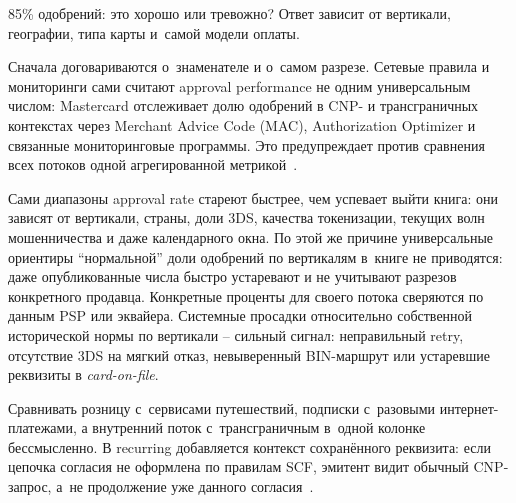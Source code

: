 85\% одобрений: это хорошо или тревожно? Ответ зависит от
вертикали, географии, типа карты и~самой модели оплаты.

Сначала договариваются о~знаменателе и о~самом разрезе. Сетевые
правила и мониторинги сами считают approval performance не одним
универсальным числом: Mastercard отслеживает долю одобрений
в CNP- и трансграничных контекстах через Merchant Advice
Code (MAC), Authorization Optimizer и связанные
мониторинговые программы. Это предупреждает против сравнения
всех потоков одной агрегированной метрикой~\cite{mc-tpr}.

Сами диапазоны approval rate стареют быстрее, чем успевает
выйти книга: они зависят от вертикали, страны, доли 3DS,
качества токенизации, текущих волн мошенничества и даже
календарного окна. По этой же причине универсальные ориентиры
\enquote{нормальной} доли одобрений по вертикалям в~книге
не приводятся: даже опубликованные числа быстро устаревают
и не учитывают разрезов конкретного продавца. Конкретные
проценты для своего потока сверяются по данным PSP или
эквайера. Системные просадки относительно собственной
исторической нормы по вертикали -- сильный сигнал: неправильный
retry, отсутствие 3DS на мягкий отказ, невыверенный BIN-маршрут
или устаревшие реквизиты в \textit{card-on-file}.

Сравнивать розницу с~сервисами путешествий, подписки с~разовыми
интернет-платежами, а внутренний поток с~трансграничным в~одной колонке
бессмысленно. В recurring добавляется контекст
сохранённого реквизита: если цепочка согласия не оформлена по
правилам SCF, эмитент
видит обычный CNP-запрос, а~не продолжение уже данного согласия~\cite{visa-scf,mc-scf}.

